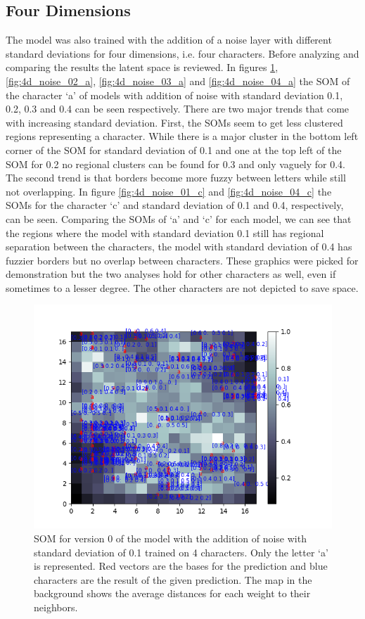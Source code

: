 \subsection{Four Dimensions}

The model was also trained with the addition of a noise layer with different standard deviations for four dimensions, i.e. four characters. Before analyzing and comparing the results the latent space is reviewed. In figures \ref{fig:4d_noise_01_a}, \ref{fig:4d_noise_02_a}, \ref{fig:4d_noise_03_a} and \ref{fig:4d_noise_04_a} the SOM of the character `a' of models with addition of noise with standard deviation 0.1, 0.2, 0.3 and 0.4 can be seen respectively. There are two major trends that come with increasing standard deviation. First, the SOMs seem to get less clustered regions representing a character. While there is a major cluster in the bottom left corner of the SOM for standard deviation of 0.1 and one at the top left of the SOM for 0.2 no regional clusters can be found for 0.3 and only vaguely for 0.4. The second trend is that borders become more fuzzy between letters while still not overlapping. In figure \ref{fig:4d_noise_01_c} and  \ref{fig:4d_noise_04_c} the SOMs for the character `c' and standard deviation of 0.1 and 0.4, respectively, can be seen. Comparing the SOMs of `a' and `c' for each model, we can see that the regions where the model with standard deviation 0.1 still has regional separation between the characters, the model with standard deviation of 0.4 has fuzzier borders but no overlap between characters. These graphics were picked for demonstration but the two analyses hold for other characters as well, even if sometimes to a lesser degree. The other characters are not depicted to save space.

\begin{figure}[!htb]
	\centering
	\includegraphics[width=\textwidth]{images/SOM_graphics/17x17_4d_noise_01_v0/a.png}
	\caption{SOM for version 0 of the model with the addition of noise with standard deviation of 0.1 trained on 4 characters. Only the letter `a' is represented. Red vectors are the bases for the prediction and blue characters are the result of the given prediction. The map in the background shows the average distances for each weight to their neighbors.}
	\label{fig:4d_noise_01_a}
\end{figure}


